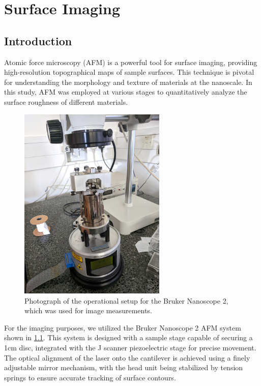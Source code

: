 
\chapter{Surface Imaging}

\section{Introduction}

Atomic force microscopy (AFM) is a powerful tool for surface imaging, providing high-resolution topographical maps of sample surfaces. This technique is pivotal for understanding the morphology and texture of materials at the nanoscale. In this study, AFM was employed at various stages to quantitatively analyze the surface roughness of different materials.

\begin{figure}[h!!!!!!!]     %
        \begin{center}
          \includegraphics[width=70mm]{chapter2/ImageAFM.jpg}
\end{center}
\caption{Photograph of the operational setup for the Bruker Nanoscope 2, which was used for image measurements.}
\label{fig:ImageAFM}                 %
\end{figure}

For the imaging purposes, we utilized the Bruker Nanoscope 2 AFM system shown in \ref{fig:ImageAFM}. This system is designed with a sample stage capable of securing a 1cm disc, integrated with the J scanner piezoelectric stage for precise movement. The optical alignment of the laser onto the cantilever is achieved using a finely adjustable mirror mechanism, with the head unit being stabilized by tension springs to ensure accurate tracking of surface contours.

